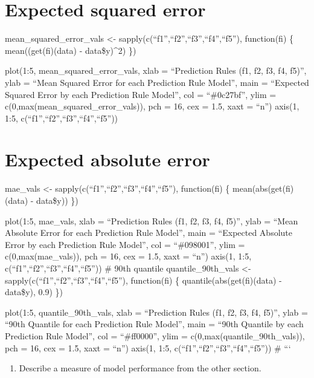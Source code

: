 \documentclass[
  letterpaper,
  DIV=11,
  numbers=noendperiod]{scrreprt}
\providecommand{\tightlist}{%
  \setlength{\itemsep}{0pt}\setlength{\parskip}{0pt}}
\begin{document}

\chapter{Expected squared error}\label{expected-squared-error}

mean\_squared\_error\_vals \textless-
sapply(c(``f1'',``f2'',``f3'',``f4'',``f5''), function(fi) \{
mean((get(fi)(data) - data\$y)\^{}2) \})

plot(1:5, mean\_squared\_error\_vals, xlab = ``Prediction Rules (f1, f2,
f3, f4, f5)'', ylab = ``Mean Squared Error for each Prediction Rule
Model'', main = ``Expected Squared Error by each Prediction Rule
Model'', col = ``\#0c27bf'', ylim =
c(0,max(mean\_squared\_error\_vals)), pch = 16, cex = 1.5, xaxt = ``n'')
axis(1, 1:5, c(``f1'',``f2'',``f3'',``f4'',``f5''))


\chapter{Expected absolute error}\label{expected-absolute-error}

mae\_vals \textless- sapply(c(``f1'',``f2'',``f3'',``f4'',``f5''),
function(fi) \{ mean(abs(get(fi)(data) - data\$y)) \})

plot(1:5, mae\_vals, xlab = ``Prediction Rules (f1, f2, f3, f4, f5)'',
ylab = ``Mean Absolute Error for each Prediction Rule Model'', main =
``Expected Absolute Error by each Prediction Rule Model'', col =
``\#098001'', ylim = c(0,max(mae\_vals)), pch = 16, cex = 1.5, xaxt =
``n'') axis(1, 1:5, c(``f1'',``f2'',``f3'',``f4'',``f5'')) \# 90th
quantile quantile\_90th\_vals \textless-
sapply(c(``f1'',``f2'',``f3'',``f4'',``f5''), function(fi) \{
quantile(abs(get(fi)(data) - data\$y), 0.9) \})

plot(1:5, quantile\_90th\_vals, xlab = ``Prediction Rules (f1, f2, f3,
f4, f5)'', ylab = ``90th Quantile for each Prediction Rule Model'', main
= ``90th Quantile by each Prediction Rule Model'', col = ``\#ff0000'',
ylim = c(0,max(quantile\_90th\_vals)), pch = 16, cex = 1.5, xaxt =
``n'') axis(1, 1:5, c(``f1'',``f2'',``f3'',``f4'',``f5'')) \# ```

\begin{enumerate}
\def\labelenumi{\arabic{enumi}.}
\setcounter{enumi}{4}
\tightlist
\item
  Describe a measure of model performance from the other section.
\end{enumerate}
\end{document}
